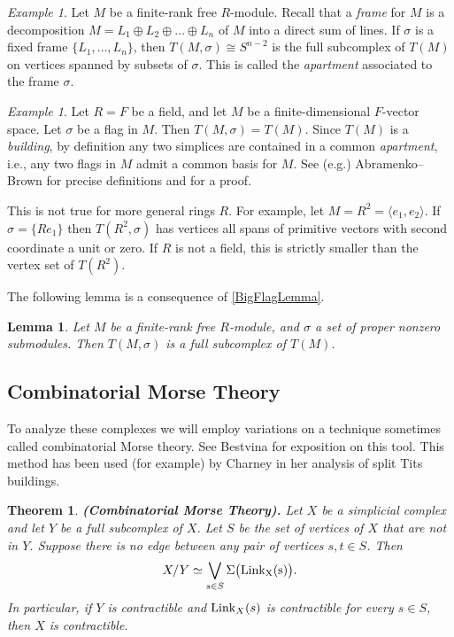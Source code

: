 \documentclass[a4paper]{amsart}
\providecommand{\Link}{\ensuremath\mr{Link}}
\numberwithin{theoremcounter}{section}
\newtheorem{theorem}[theoremauto]{Theorem}
\newtheorem{lemma}[lemmaauto]{Lemma}
\theoremstyle{definition}
\theoremstyle{remark}
\newtheorem{example}[exampleauto]{Example}
\newcommand{\mr}[1]{{\rm #1}}
\newcommand{\Lk}{\mr{Link}}
\begin{document}
\begin{example} Let $M$ be a finite-rank free $R$-module. Recall that a \emph{frame} for $M$ is a decomposition $M= L_1\oplus L_2 \oplus \dots \oplus L_n$ of $M$ into a direct sum of lines. If $\sigma$ is a fixed frame $\{L_1, \dots, L_n\}$, then $T(M, \sigma) \cong S^{n-2}$  is the full subcomplex of $T(M)$ on vertices spanned by subsets of $\sigma$. This is called the \emph{apartment} associated to the frame $\sigma$. 
\end{example} 


\begin{example} Let $R=F$ be a field, and let $M$ be a finite-dimensional $F$-vector space. Let $\sigma$ be a flag in $M$. Then $T(M, \sigma) = T(M)$.  Since $T(M)$ is a \emph{building}, by definition any two simplices are contained in a common \emph{apartment}, i.e., any two flags in $M$ admit a common basis for $M$. 
See (e.g.) Abramenko--Brown \cite[Section 4]{AbramenkoBrown} for precise definitions and \cite[Section 4.3]{AbramenkoBrown} for a proof. 

This is not true for more general rings $R$. For example, let $M=R^2 = \langle e_1, e_2\rangle.$  If  $\sigma = \{ R e_1 \}$ then $T(R^2, \sigma)$ has vertices all spans of primitive vectors with second coordinate a unit or zero. If $R$ is not a field, this is strictly smaller than the vertex set of $T(R^2)$. 
\end{example} 



The following lemma is a consequence of \autoref{BigFlagLemma}. 

\begin{lemma} Let $M$ be a finite-rank free $R$-module, and $\sigma$ a set of proper nonzero submodules. Then $T(M, \sigma)$ is a full subcomplex of $T(M)$. 
\end{lemma} 




\subsection{Combinatorial Morse Theory}
To analyze these complexes we will employ variations on a technique sometimes called combinatorial Morse theory. See Bestvina \cite{Bestvina-MorseTheory} for exposition on this tool. This method has been used (for example) by Charney \cite{Charney} in her analysis of split Tits buildings. 
 

\begin{theorem}{\bf (Combinatorial Morse Theory).}  \label{Morse} Let $X$ be a simplicial complex and let $Y$ be a full subcomplex of $X$. Let $S$ be the set of  vertices of $X$ that are not in $Y$. Suppose there is no edge between any pair of vertices $s,t  \in S$. Then $$X/Y \simeq  \bigvee_{s \in S} \Sigma \big( \Link_X(s) \big).$$ In particular, if $Y$ is contractible and $  \Lk_X(s) $ is contractible for every $s \in S$, then $X$ is contractible. 

\end{theorem}
\end{document}
